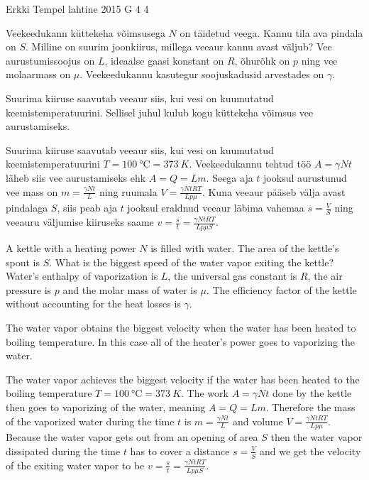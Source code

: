 {Erkki Tempel} %
{lahtine} %
{2015} %
{G 4} %
{4} %
{
\ifStatement
Veekeedukann küttekeha võimsusega $N$ on täidetud veega. Kannu tila ava pindala on $S$. Milline on suurim joonkiirus, millega veeaur kannu avast väljub? Vee aurustumissoojus on $L$, ideaalse gaasi konstant on $R$, õhurõhk on $p$ ning vee molaarmass on $\mu$. Veekeedukannu kasutegur soojuskadusid arvestades on $\gamma$.
\fi


\ifHint
Suurima kiiruse saavutab veeaur siis, kui vesi on kuumutatud keemistemperatuurini. Sellisel juhul kulub kogu küttekeha võimsus vee aurustamiseks.
\fi


\ifSolution
Suurima kiiruse saavutab veeaur siis, kui vesi on kuumutatud keemistemperatuurini $T=\SI{100}{\celsius}=\SI{373}{K}$. Veekeedukannu tehtud töö $A=\gamma Nt$ läheb siis vee aurustamiseks ehk $A=Q=Lm$. Seega aja $t$ jooksul aurustunud vee mass on $m=\frac{\gamma Nt}{L}$ ning ruumala $V=\frac{\gamma NtRT}{Lp\mu}$. Kuna veeaur pääseb välja avast pindalaga $S$, siis peab aja $t$ jooksul eraldnud veeaur läbima vahemaa $s=\frac{V}{S}$ ning veeauru väljumise kiiruseks saame
$v=\frac{s}{t}=\frac{\gamma NtRT}{Lp\mu S}$.
\fi


\ifEngStatement
A kettle with a heating power $N$ is filled with water. The area of the kettle’s spout is $S$. What is the biggest speed of the water vapor exiting the kettle? Water’s enthalpy of vaporization is $L$, the universal gas constant is $R$, the air pressure is $p$ and the molar mass of water is $\mu$. The efficiency factor of the kettle without accounting for the heat losses is $\gamma$.
\fi


\ifEngHint
The water vapor obtains the biggest velocity when the water has been heated to boiling temperature. In this case all of the heater’s power goes to vaporizing the water.
\fi


\ifEngSolution
The water vapor achieves the biggest velocity if the water has been heated to the boiling temperature $T=\SI{100}{\celsius}=\SI{373}{K}$. The work $A=\gamma Nt$ done by the kettle then goes to vaporizing of the water, meaning $A=Q=Lm$. Therefore the mass of the vaporized water during the time $t$ is $m=\frac{\gamma Nt}{L}$ and volume $V=\frac{\gamma NtRT}{Lp\mu}$. Because the water vapor gets out from an opening of area $S$ then the water vapor dissipated during the time $t$ has to cover a distance $s=\frac{V}{S}$ and we get the velocity of the exiting water vapor to be $v=\frac{s}{t}=\frac{\gamma NtRT}{Lp\mu S}$.
\fi
}